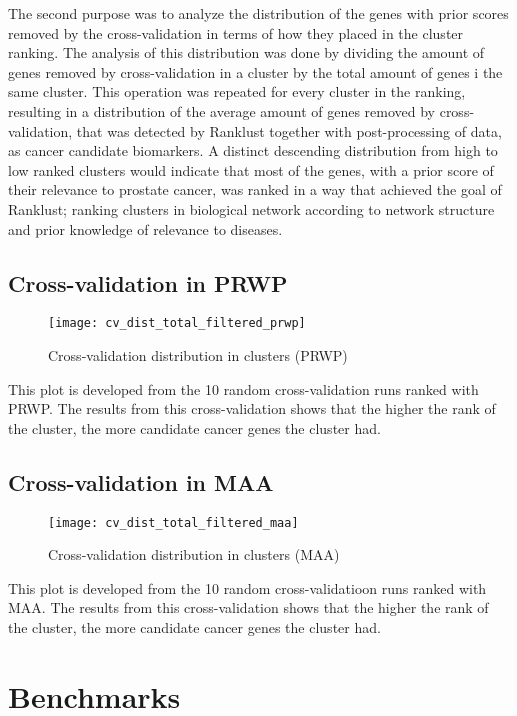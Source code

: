 The second purpose was to analyze the distribution of the genes with prior
scores removed by the cross-validation in terms of how they placed in the
cluster ranking. The analysis of this distribution was done by dividing the
amount of genes removed by cross-validation in a cluster by the total amount of
genes i the same cluster. This operation was repeated for every cluster in the
ranking, resulting in a distribution of the average amount of genes removed by
cross-validation, that was detected by Ranklust together with post-processing of
data, as cancer candidate biomarkers. A distinct descending distribution from
high to low ranked clusters would indicate that most of the genes, with a prior
score of their relevance to prostate cancer, was ranked in a way that achieved
the goal of Ranklust; ranking clusters in biological network according to
network structure and prior knowledge of relevance to diseases.

\subsection{Cross-validation in PRWP}
\begin{figure}[H]
    \label{fig:irefweb-prwp}
    \texttt{[image: cv\_dist\_total\_filtered\_prwp]}
    \caption{Cross-validation distribution in clusters (PRWP)}
\end{figure}
This plot is developed from the 10 random cross-validation runs ranked with
PRWP. The results from this cross-validation shows that the higher the rank of
the cluster, the more candidate cancer genes the cluster had.

\subsection{Cross-validation in MAA}
\begin{figure}[H]
    \label{fig:irefweb-maa}
    \texttt{[image: cv\_dist\_total\_filtered\_maa]}
    \caption{Cross-validation distribution in clusters (MAA)}
\end{figure}
This plot is developed from the 10 random cross-validatioon runs ranked with
MAA.  The results from this cross-validation shows that the higher the rank of
the cluster, the more candidate cancer genes the cluster had.

\section{Benchmarks}
